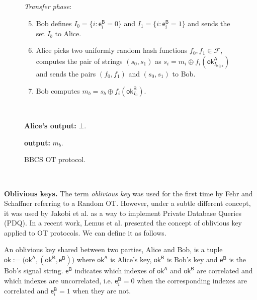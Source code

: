 \begin{figure}[h!]
\begin{tcolorbox}
            \textit{Transfer phase}:
            \begin{enumerate}
            \setcounter{enumi}{4}
                \item Bob defines $I_0 = \{ i : \mathsf{e}^{\mathsf{B}}_i = 0 \}$ and $I_1 = \{ i : \mathsf{e}^{\mathsf{B}}_i = 1 \}$ and sends the set $I_b$ to Alice.
                \item Alice picks two uniformly random hash functions $f_0, f_1 \in \mathcal{F}$, computes the pair of strings $(s_0, s_1)$ as $s_i = m_i \oplus f_i(\mathsf{ok}^{\mathsf{A}}_{I_{b\oplus i}})$ and sends the pairs $(f_0, f_1)$ and $(s_0, s_1)$ to Bob.
                \item Bob computes $m_b = s_b \oplus  f_i(\mathsf{ok}^{\mathsf{B}}_{I_0})$. 
            \end{enumerate}
            
            \
            
        \textbf{Alice's output:} $\bot$.
        
        \textbf{output:} $m_b$.
        
        \end{tcolorbox}
    \caption{BBCS OT protocol.}
    \label{fig:BBCS}
\end{figure}

\

\noindent\textbf{Oblivious keys.} The term \textit{oblivious key} was used for the first time by Fehr and Schaffner \cite{FS09} referring to a Random OT. However, under a subtle different concept, it was used by Jakobi et al. \cite{JSGBBWZ11} as a way to implement Private Database Queries (PDQ). In a recent work, Lemus et al. \cite{Lemus20} presented the concept of oblivious key applied to OT protocols. We can define it as follows.

\begin{definition}
An oblivious key shared between two parties, Alice and Bob, is a tuple $\mathsf{ok}:= \big( \mathsf{ok}^{\mathsf{A}}, (\mathsf{ok}^{\mathsf{B}}, \mathsf{e}^{\mathsf{B}}) \big)$ where $\mathsf{ok}^{\mathsf{A}}$ is Alice's key, $\mathsf{ok}^{\mathsf{B}}$ is Bob's key and $\mathsf{e}^{\mathsf{B}}$ is the Bob's signal string. $\mathsf{e}^{\mathsf{B}}$ indicates which indexes of $\mathsf{ok}^{\mathsf{A}}$ and $\mathsf{ok}^{\mathsf{B}}$ are correlated and which indexes are uncorrelated, i.e. $\mathsf{e}^{\mathsf{B}}_i = 0$ when the corresponding indexes are correlated and $\mathsf{e}^{\mathsf{B}}_i = 1$ when they are not.
\label{def:ok}
\end{definition}

